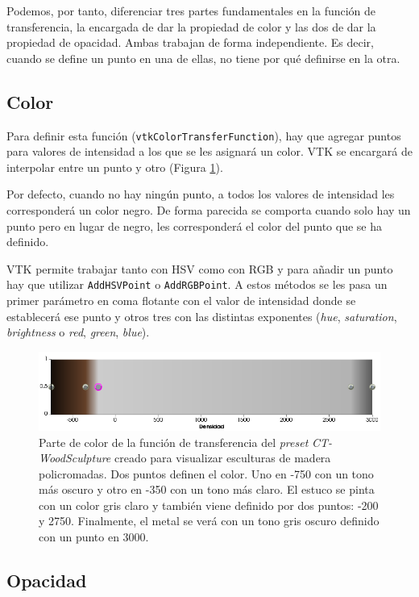Podemos, por tanto, diferenciar tres partes fundamentales en la función de transferencia, la encargada de dar la propiedad de color y las dos de dar la propiedad de opacidad. Ambas trabajan de forma independiente. Es decir, cuando se define un punto en una de ellas, no tiene por qué definirse en la otra.

\subsection{Color}

Para definir esta función (\texttt{vtkColorTransferFunction}), hay que agregar puntos para valores de intensidad a los que se les asignará un color. VTK se encargará de interpolar entre un punto y otro (Figura \ref{fig:color_tf}). 

Por defecto, cuando no hay ningún punto, a todos los valores de intensidad les corresponderá un color negro. De forma parecida se comporta cuando solo hay un punto pero en lugar de negro, les corresponderá el color del punto que se ha definido.

VTK permite trabajar tanto con HSV como con RGB y para añadir un punto hay que utilizar \texttt{AddHSVPoint} o \texttt{AddRGBPoint}. A estos métodos se les pasa un primer parámetro en coma flotante con el valor de intensidad donde se establecerá ese punto y otros tres con las distintas exponentes (\textit{hue}, \textit{saturation}, \textit{brightness} o \textit{red}, \textit{green}, \textit{blue}).

\begin{figure}[H]
	\centering
	\includegraphics[width=12.5cm]{imagenes/color_tf}
	\caption{Parte de color de la función de transferencia del \textit{preset} \textit{CT-WoodSculpture} creado para visualizar esculturas de madera policromadas. Dos puntos definen el color. Uno en -750 con un tono más oscuro y otro en -350 con un tono más claro. El estuco se pinta con un color gris claro y también viene definido por dos puntos: -200 y 2750. Finalmente, el metal se verá con un tono gris oscuro definido con un punto en 3000.}
	\label{fig:color_tf}
\end{figure}

\subsection{Opacidad}

